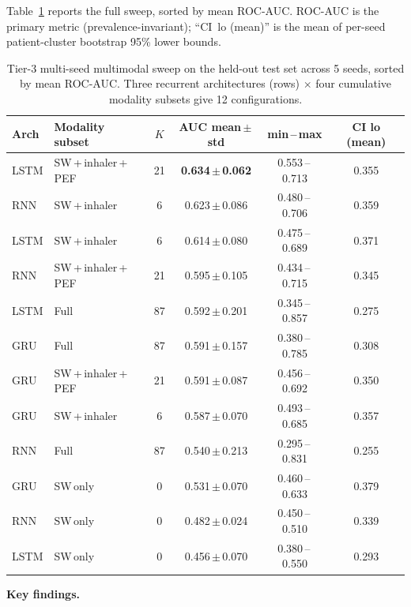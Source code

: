 \documentclass[11pt,a4paper]{article}
\begin{document}
Table~\ref{tab:multimodal_results} reports the full sweep, sorted by mean
ROC-AUC.  ROC-AUC is the primary metric (prevalence-invariant); ``CI~lo
(mean)'' is the mean of per-seed patient-cluster bootstrap 95\% lower
bounds.

\begin{table}[H]
\centering
\caption{Tier-3 multi-seed multimodal sweep on the held-out test set
across 5 seeds, sorted by mean ROC-AUC.
Three recurrent architectures (rows) $\times$ four cumulative modality
subsets give 12 configurations.}
\label{tab:multimodal_results}
\small
\begin{tabular}{llcccc}
\toprule
\textbf{Arch} & \textbf{Modality subset} & $K$
  & \textbf{AUC mean\,$\pm$\,std} & \textbf{min\,--\,max} & \textbf{CI lo (mean)} \\
\midrule
LSTM & SW\,+\,inhaler\,+\,PEF & 21 & \textbf{0.634\,$\pm$\,0.062} & 0.553\,--\,0.713 & 0.355 \\
RNN  & SW\,+\,inhaler         &  6 & 0.623\,$\pm$\,0.086 & 0.480\,--\,0.706 & 0.359 \\
LSTM & SW\,+\,inhaler         &  6 & 0.614\,$\pm$\,0.080 & 0.475\,--\,0.689 & 0.371 \\
RNN  & SW\,+\,inhaler\,+\,PEF & 21 & 0.595\,$\pm$\,0.105 & 0.434\,--\,0.715 & 0.345 \\
LSTM & Full                   & 87 & 0.592\,$\pm$\,0.201 & 0.345\,--\,0.857 & 0.275 \\
GRU  & Full                   & 87 & 0.591\,$\pm$\,0.157 & 0.380\,--\,0.785 & 0.308 \\
GRU  & SW\,+\,inhaler\,+\,PEF & 21 & 0.591\,$\pm$\,0.087 & 0.456\,--\,0.692 & 0.350 \\
GRU  & SW\,+\,inhaler         &  6 & 0.587\,$\pm$\,0.070 & 0.493\,--\,0.685 & 0.357 \\
RNN  & Full                   & 87 & 0.540\,$\pm$\,0.213 & 0.295\,--\,0.831 & 0.255 \\
GRU  & SW\,only               &  0 & 0.531\,$\pm$\,0.070 & 0.460\,--\,0.633 & 0.379 \\
RNN  & SW\,only               &  0 & 0.482\,$\pm$\,0.024 & 0.450\,--\,0.510 & 0.339 \\
LSTM & SW\,only               &  0 & 0.456\,$\pm$\,0.070 & 0.380\,--\,0.550 & 0.293 \\
\bottomrule
\end{tabular}
\end{table}

\noindent\textbf{Key findings.}
\end{document}
